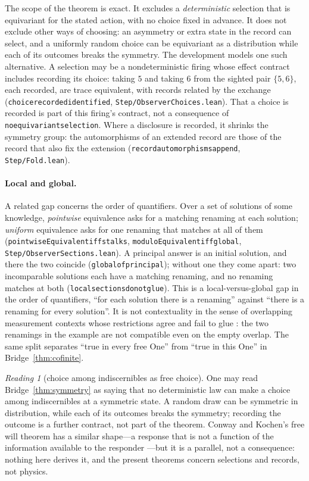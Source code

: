 \documentclass[]{article}
\theoremstyle{definition}
\theoremstyle{remark}
\newtheorem{reading}[theorem]{Reading}
\newcommand{\codeus}{\textunderscore\allowbreak}
\newcommand{\code}[1]{\texttt{\let\_\codeus #1}}
\newcommand{\lpath}[1]{{\ttfamily\nolinkurl{#1}}}
\newcommand{\step}[1]{\lpath{Step/#1.lean}}
\begin{document}
The scope of the theorem is exact. It excludes a \emph{deterministic} selection that is equivariant
for the stated action, with no choice fixed in advance. It does not exclude other ways of choosing:
an asymmetry or extra state in the record can select, and a uniformly random choice can be
equivariant as a distribution while each of its outcomes breaks the symmetry. The development models
one such alternative. A selection may be a nondeterministic firing whose effect contract includes
recording its choice: taking $5$ and taking $6$ from the sighted pair $\{5,6\}$, each recorded, are
trace equivalent, with records related by the exchange (\code{choice\_recorded\_identified},
\step{ObserverChoices}). That a choice is recorded is part of this firing's contract, not a consequence
of \code{no\_equivariant\_selection}. Where a disclosure is recorded, it shrinks the symmetry group: the
automorphisms of an extended record are those of the record that also fix the extension
(\code{record\_automorphisms\_append}, \step{Fold}).

\paragraph{Local and global.} A related gap concerns the order of quantifiers. Over a set of
solutions of some knowledge, \emph{pointwise} equivalence asks for a matching renaming at each
solution; \emph{uniform} equivalence asks for one renaming that matches at all of them
(\code{pointwiseEquivalent\_iff\_stalks}, \code{moduloEquivalent\_iff\_global},
\step{ObserverSections}). A principal answer is an initial solution, and there the two coincide
(\code{global\_of\_principal}); without one they come apart: two incomparable solutions each have a
matching renaming, and no renaming matches at both (\code{local\_sections\_do\_not\_glue}). This is a
local-versus-global gap in the order of quantifiers, ``for each solution there is a renaming'' against
``there is a renaming for every solution''. It is not contextuality in the sense of overlapping
measurement contexts whose restrictions agree and fail to glue \cite{AbramskyBrandenburger2011}: the
two renamings in the example are not compatible even on the empty overlap. The same split separates
``true in every free One'' from ``true in this One'' in Bridge~\ref{thm:cofinite}.

\begin{reading}[choice among indiscernibles as free choice]
\label{read:freechoice}
One may read Bridge~\ref{thm:symmetry} as saying that no deterministic law can make a choice among
indiscernibles at a symmetric state. A random draw can be symmetric in distribution, while each of its
outcomes breaks the symmetry; recording the outcome is a further contract, not part of the theorem.
Conway and Kochen's free will theorem has a similar shape---a response that is not a function of
the information available to the responder \cite{ConwayKochen2006}---but it is a parallel, not a
consequence: nothing here derives it, and the present theorems concern selections and records, not
physics.
\end{reading}
\end{document}
